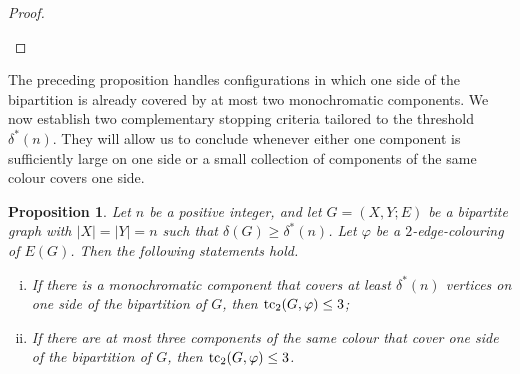 \documentclass[12pt,reqno,a4paper]{amsart}
\newtheorem{proposition}[theorem] {Proposition}
\def\tc{\mathop{\text{\rm tc}}\nolimits}
\begin{document}
\begin{proof}
\begin{center}
\begin{minipage}{\textwidth}

    \label{fig:prop5_distinct}
\end{minipage}
\end{center}
\end{proof}

The preceding proposition handles configurations in which one side of the
bipartition is already covered by at most two monochromatic components. We now
establish two complementary stopping criteria tailored to the threshold
$\delta^*(n)$. They will allow us to conclude whenever either one component is
sufficiently large on one side or a small collection of components of the same
colour covers one side.
\begin{proposition}\label{prop:7}
%
Let $n$ be a positive integer, and let $G=(X,Y;E)$ be a bipartite graph with
$|X|=|Y|=n$ such that $\delta(G)\ge\delta^*(n)$. Let $\varphi$ be a
$2$-edge-colouring of $E(G)$. Then the following statements hold.
\begin{enumerate}[(i)]
\item If there is a monochromatic component that covers at least $\delta^*(n)$
vertices on one side of the bipartition of $G$, then $\tc_2(G,\varphi) \le 3$;
\label{prop:7-item1}
\item If there are at most three components of the same colour that cover one
side of the bipartition of $G$, then $\tc_2(G,\varphi) \le 3$.\label{prop:7-item2}
\end{enumerate}
\end{proposition}
\end{document}
